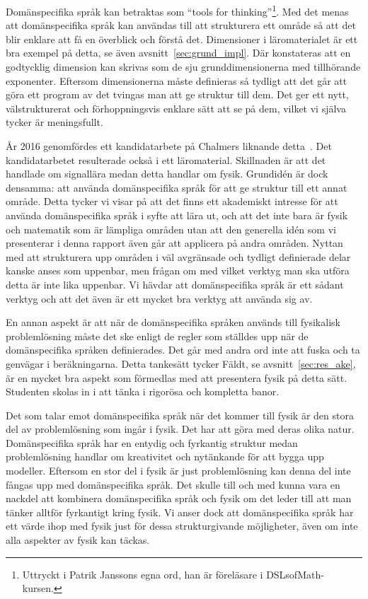 Domänspecifika språk kan betraktas som ``tools for thinking''\footnote{Uttryckt i Patrik Janssons egna ord, han är föreläsare i DSLsofMath-kursen.}. Med det menas att domänspecifika språk kan användas
till att strukturera ett område så att det blir enklare att få en överblick och
förstå det. Dimensioner i läromaterialet är ett bra exempel på
detta, se även avsnitt~\ref{sec:grund_impl}. Där konstateras att en godtycklig
dimension kan skrivas som de sju grunddimensionerna med tillhörande exponenter.
Eftersom dimensionerna måste definieras så tydligt att det går att göra ett
program av det tvingas man att ge struktur till dem. Det ger ett nytt,
välstrukturerat och förhoppningsvis enklare sätt att se på dem, vilket vi själva
tycker är meningsfullt.

År 2016 genomfördes ett kandidatarbete på Chalmers liknande
detta~\cite{kandidat2016}. Det kandidatarbetet resulterade också i ett
läromaterial. Skillnaden är att det handlade om signallära medan detta handlar
om fysik. Grundidén är dock densamma: att använda domänspecifika språk för att
ge struktur till ett annat område.  Detta tycker vi visar på att det finns ett
akademiskt intresse för att använda domänspecifika språk i syfte att lära ut,
och att det inte bara är fysik och matematik som är lämpliga områden utan att
den generella idén som vi presenterar i denna rapport även går att applicera på
andra områden. Nyttan med att strukturera upp områden i väl avgränsade och
tydligt definierade delar kanske anses som uppenbar, men frågan om med vilket
verktyg man ska utföra detta är inte lika uppenbar. Vi hävdar att domänspecifika
språk är ett sådant verktyg och att det även är ett mycket bra verktyg att
använda sig av.

En annan aspekt är att när de domänspecifika språken används till fysikalisk
problemlösning måste det ske enligt de regler som ställdes upp när de
domänspecifika språken definierades. Det går med andra ord inte att fuska och ta
genvägar i beräkningarna. Detta tankesätt tycker Fäldt, se
avsnitt~\ref{sec:res_ake}, är en mycket bra aspekt som förmedlas med att
presentera fysik på detta sätt. Studenten skolas in i att tänka i rigorösa och
kompletta banor.

Det som talar emot
domänspecifika språk när det kommer till fysik är den stora del av problemlösning
som ingår i fysik. Det har att göra med deras olika natur. Domänspecifika språk
har en entydig och fyrkantig struktur medan problemlösning handlar om
kreativitet och nytänkande för att bygga upp modeller. Eftersom en stor del i fysik är just problemlösning
kan denna del inte fångas upp med domänspecifika språk. Det skulle till och med
kunna vara en nackdel att kombinera domänspecifika språk och fysik om det leder
till att man tänker alltför fyrkantigt kring fysik. Vi anser dock att
domänspecifika språk har ett värde ihop med fysik just för dessa strukturgivande
möjligheter, även om inte alla aspekter av fysik kan täckas.

